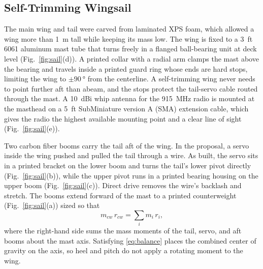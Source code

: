 \subsection{Self-Trimming Wingsail}
The main wing and tail were carved from laminated XPS foam, which allowed a
wing more than \SI{1}{\meter} tall while keeping its mass low. The wing is
fixed to a \SI{3}{ft} 6061 aluminum mast tube that turns freely in a flanged ball-bearing unit at
deck level (Fig.~\ref{fig:sail}(d)). A printed collar with a radial arm
clamps the mast above the bearing and travels inside a printed guard ring
whose ends are hard stops, limiting the wing to $\pm\SI{90}{\degree}$ from
the centerline. A self-trimming wing never needs to point further aft than
abeam, and the stops protect the tail-servo cable routed through the mast. A \SI{10}{dBi} whip antenna for the
\SI{915}{\mega\hertz} radio is mounted at the masthead on a \SI{5}{ft} SubMiniature version A (SMA)
extension cable, which gives the radio the highest available mounting point
and a clear line of sight (Fig.~\ref{fig:sail}(e)).

Two carbon fiber booms carry the tail aft of the wing. In the proposal, a
servo inside the wing pushed and pulled the tail through a wire. As built,
the servo sits in a printed bracket on the lower boom and turns the tail's
lower pivot directly (Fig.~\ref{fig:sail}(b)), while the upper pivot runs in
a printed bearing housing on the upper boom (Fig.~\ref{fig:sail}(c)). Direct
drive removes the wire's backlash and stretch. The booms extend forward of the
mast to a printed counterweight (Fig.~\ref{fig:sail}(a)) sized so that
\begin{equation}
m_{cw}\, r_{cw} = \sum_i m_i\, r_i ,
\label{eq:balance}
\end{equation}
where the right-hand side sums the mass moments of the tail, servo, and aft
booms about the mast axis. Satisfying \eqref{eq:balance} places the combined center of gravity on the axis, so heel and pitch do not apply a rotating moment to the wing.

